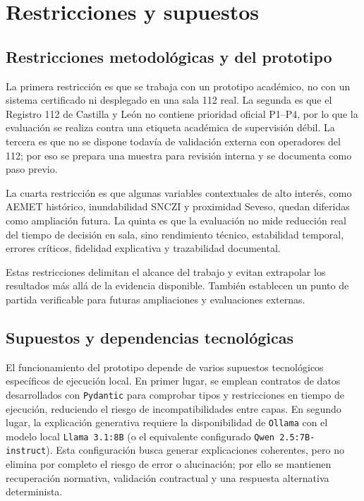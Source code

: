 \section{Restricciones y supuestos}

\subsection{Restricciones metodológicas y del prototipo}
La primera restricción es que se trabaja con un prototipo académico, no con un sistema certificado ni desplegado en una sala 112 real. La segunda es que el Registro 112 de Castilla y León no contiene prioridad oficial P1--P4, por lo que la evaluación se realiza contra una etiqueta académica de supervisión débil. La tercera es que no se dispone todavía de validación externa con operadores del 112; por eso se prepara una muestra para revisión interna y se documenta como paso previo.

La cuarta restricción es que algunas variables contextuales de alto interés, como AEMET histórico, inundabilidad SNCZI y proximidad Seveso, quedan diferidas como ampliación futura. La quinta es que la evaluación no mide reducción real del tiempo de decisión en sala, sino rendimiento técnico, estabilidad temporal, errores críticos, fidelidad explicativa y trazabilidad documental.

Estas restricciones delimitan el alcance del trabajo y evitan extrapolar los resultados más allá de la evidencia disponible. También establecen un punto de partida verificable para futuras ampliaciones y evaluaciones externas.

\subsection{Supuestos y dependencias tecnológicas}
El funcionamiento del prototipo depende de varios supuestos tecnológicos específicos de ejecución local. En primer lugar, se emplean contratos de datos desarrollados con \texttt{Pydantic} para comprobar tipos y restricciones en tiempo de ejecución, reduciendo el riesgo de incompatibilidades entre capas. En segundo lugar, la explicación generativa requiere la disponibilidad de \texttt{Ollama} con el modelo local \texttt{Llama 3.1:8B} (o el equivalente configurado \texttt{Qwen 2.5:7B-instruct}). Esta configuración busca generar explicaciones coherentes, pero no elimina por completo el riesgo de error o alucinación; por ello se mantienen recuperación normativa, validación contractual y una respuesta alternativa determinista.


